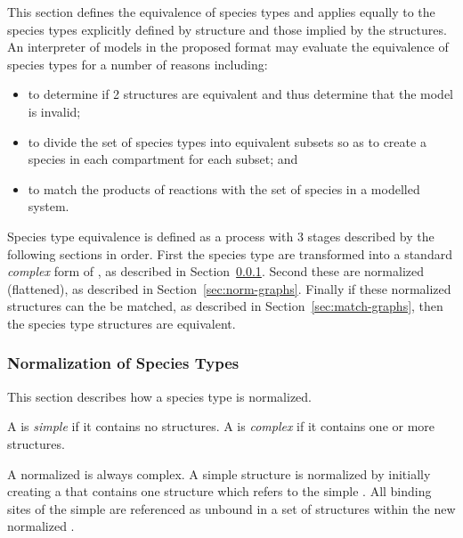 \documentclass{cekarticle}
\begin{document}
This section defines the equivalence of species types and applies
equally to the species types explicitly defined by
 structure and those implied by the
 structures.  An interpreter of models in the
proposed format may evaluate the equivalence of species types for
a number of reasons including:

\begin{itemize}

\item to determine if 2  structures are equivalent
and thus determine that the model is invalid;

\item to divide the set of species types into equivalent subsets
so as to create a species in each compartment for each subset; and

\item to match the products of reactions with the set of species
in a modelled system.

\end{itemize}

Species type equivalence is defined as a process with 3 stages
described by the following sections in order.  First the species
type are transformed into a standard \emph{complex} form of
, as described in
Section~\ref{sec:trans-type}. Second these 
are normalized (flattened), as described in
Section~\ref{sec:norm-graphs}. Finally if these normalized
structures can the be matched, as described in
Section~\ref{sec:match-graphs}, then the species type structures
are equivalent.

\subsubsection{Normalization of Species Types}
\label{sec:trans-type}

This section describes how a species type is normalized.

A  is \emph{simple} if it contains no  structures.
A  is \emph{complex} if it contains one or more  structures.

A normalized  is always complex. A simple
 structure is normalized by initially creating
a  that contains one
 structure which refers to the simple
. All binding sites of the simple
 are referenced as unbound in a set of
 structures within the new normalized
.
\end{document}
